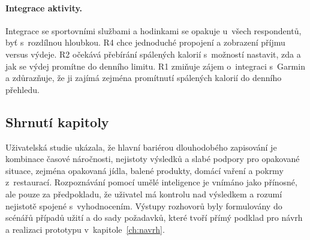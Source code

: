 \paragraph{Integrace aktivity.}
Integrace se sportovními službami a hodinkami se opakuje u~všech respondentů, byť s~rozdílnou hloubkou.
R4 chce jednoduché propojení a zobrazení příjmu versus výdeje.
R2 očekává přebírání spálených kalorií s~možností nastavit, zda a jak se výdej promítne do denního limitu.
R1 zmiňuje zájem o~integraci s~Garmin a zdůrazňuje, že ji zajímá zejména promítnutí spálených kalorií do denního přehledu.

\subsection{Shrnutí kapitoly}
\label{subsec:shrnutiUS}

Uživatelská studie ukázala, že hlavní bariérou dlouhodobého zapisování je kombinace časové náročnosti, nejistoty výsledků a slabé podpory pro opakované situace, zejména opakovaná jídla, balené produkty, domácí vaření a pokrmy z~restaurací.
Rozpoznávání pomocí umělé inteligence je vnímáno jako přínosné, ale pouze za předpokladu, že uživatel má kontrolu nad výsledkem a rozumí nejistotě spojené s~vyhodnocením.
Výstupy rozhovorů byly formulovány do scénářů případů užití a do sady požadavků, které tvoří přímý podklad pro návrh a realizaci prototypu v~kapitole~\ref{ch:navrh}.
